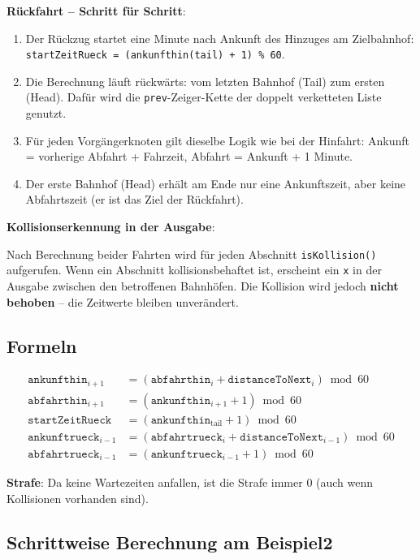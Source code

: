\documentclass[12pt,a4paper]{article}
\begin{document}
\textbf{Rückfahrt -- Schritt für Schritt}:

\begin{enumerate}
    \item Der Rückzug startet eine Minute nach Ankunft des Hinzuges am Zielbahnhof: \texttt{startZeitRueck = (ankunfthin(tail) + 1) \% 60}.
    \item Die Berechnung läuft rückwärts: vom letzten Bahnhof (Tail) zum ersten (Head). Dafür wird die \texttt{prev}-Zeiger-Kette der doppelt verketteten Liste genutzt.
    \item Für jeden Vorgängerknoten gilt dieselbe Logik wie bei der Hinfahrt: Ankunft = vorherige Abfahrt + Fahrzeit, Abfahrt = Ankunft + 1 Minute.
    \item Der erste Bahnhof (Head) erhält am Ende nur eine Ankunftszeit, aber keine Abfahrtszeit (er ist das Ziel der Rückfahrt).
\end{enumerate}

\textbf{Kollisionserkennung in der Ausgabe}:

Nach Berechnung beider Fahrten wird für jeden Abschnitt \texttt{isKollision()} aufgerufen. Wenn ein Abschnitt kollisionsbehaftet ist, erscheint ein \texttt{x} in der Ausgabe zwischen den betroffenen Bahnhöfen. Die Kollision wird jedoch \textbf{nicht behoben} -- die Zeitwerte bleiben unverändert.

\subsection{Formeln}

\begin{align*}
    \texttt{ankunfthin}_{i+1} &= (\texttt{abfahrthin}_i + \texttt{distanceToNext}_i) \bmod 60 \\
    \texttt{abfahrthin}_{i+1} &= (\texttt{ankunfthin}_{i+1} + 1) \bmod 60 \\[6pt]
    \texttt{startZeitRueck}   &= (\texttt{ankunfthin}_\text{tail} + 1) \bmod 60 \\
    \texttt{ankunftrueck}_{i-1} &= (\texttt{abfahrtrueck}_i + \texttt{distanceToNext}_{i-1}) \bmod 60 \\
    \texttt{abfahrtrueck}_{i-1} &= (\texttt{ankunftrueck}_{i-1} + 1) \bmod 60
\end{align*}

\textbf{Strafe}: Da keine Wartezeiten anfallen, ist die Strafe immer $0$ (auch wenn Kollisionen vorhanden sind).

\subsection{Schrittweise Berechnung am Beispiel2}
\end{document}
